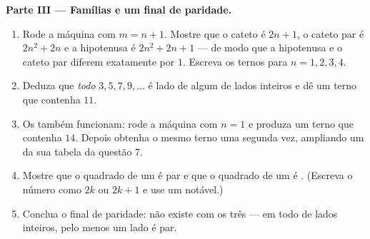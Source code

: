 \begin{problem}[{Problema de fim de semana --- triângulos retângulos de
lados inteiros e a identidade
$(m^2 - n^2)^2 + (2mn)^2 = (m^2 + n^2)^2$ que gera todos eles}]
\medskip
\noindent\textbf{Parte III --- Famílias e um final de paridade.}
\begin{enumerate}[resume]
  \item Rode a máquina com $m = n + 1$. Mostre que o cateto  é
        $2n + 1$, o cateto par é $2n^2 + 2n$ e a hipotenusa é
        $2n^2 + 2n + 1$ --- de modo que a hipotenusa e o cateto par
        diferem exatamente por $1$. Escreva os ternos para
        $n = 1, 2, 3, 4$.
  \item Deduza que \emph{todo}  $3, 5, 7, 9, \dots$ é lado
        de algum  de lados inteiros e dê um terno
        que contenha $11$.
  \item Os  também funcionam: rode a máquina com $n = 1$ e
        produza um terno que contenha $14$. Depois obtenha o mesmo
        terno uma segunda vez, ampliando um da sua tabela da questão
        7.
  \item Mostre que o quadrado de um  é par e que o quadrado
        de um  é . (Escreva o número como $2k$ ou
        $2k + 1$ e use um  notável.)
  \item Conclua o final de paridade: não existe  com os
        três  --- em todo  de lados
        inteiros, pelo menos um lado é par.
\end{enumerate}
\end{problem}
